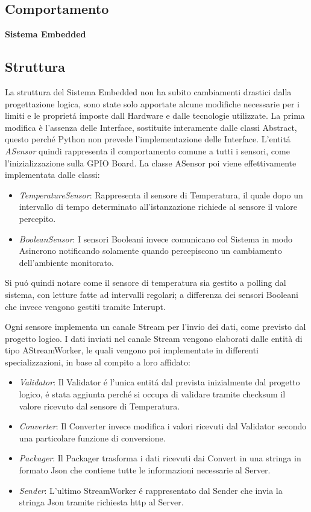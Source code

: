 \subsection{Comportamento}

\begin{center}
  \textbf{Sistema Embedded}
\end{center}

\subsection{Struttura}
La struttura del Sistema Embedded non ha subito cambiamenti drastici dalla progettazione logica, sono state solo apportate alcune modifiche necessarie per i limiti e le propriet\'a imposte dall Hardware e dalle tecnologie utilizzate.
La prima modifica è l'assenza delle Interface, sostituite interamente dalle classi Abstract, questo perch\'e Python non prevede l'implementazione delle Interface.
L'entit\'a \textit{ASensor} quindi rappresenta il comportamento comune a tutti i sensori, come l'inizializzazione sulla GPIO Board.
La classe ASensor poi viene effettivamente implementata dalle classi:
\begin{itemize}
\item \textit{TemperatureSensor}: Rappresenta il sensore di Temperatura, il quale dopo un intervallo di tempo determinato all'istanzazione richiede al sensore il valore percepito.
\item \textit{BooleanSensor}: I sensori Booleani invece comunicano col Sistema in modo Asincrono notificando solamente quando percepiscono un cambiamento dell'ambiente monitorato.
\end{itemize}

Si pu\'o quindi notare come il sensore di temperatura sia gestito a polling dal sistema, con letture fatte ad intervalli regolari; a differenza dei sensori Booleani che invece vengono gestiti tramite Interupt.

Ogni sensore implementa un canale Stream per l'invio dei dati, come previsto dal progetto logico.
I dati inviati nel canale Stream vengono elaborati dalle entità di tipo AStreamWorker, le quali vengono poi implementate in differenti specializzazioni, in base al compito a loro affidato:
\begin{itemize}
\item \textit{Validator}: Il Validator \'e l'unica entit\'a dal prevista inizialmente dal progetto logico, \'e stata aggiunta perch\'e si occupa di validare tramite checksum il valore ricevuto dal sensore di Temperatura.
\item \textit{Converter}: Il Converter invece modifica i valori ricevuti dal Validator secondo una particolare funzione di conversione.
\item \textit{Packager}: Il Packager trasforma i dati ricevuti dai Convert in una stringa in formato Json che contiene tutte le informazioni necessarie al Server.
\item \textit{Sender}: L'ultimo StreamWorker \'e rappresentato dal Sender che invia la stringa Json tramite richiesta http al Server.
\end{itemize}

